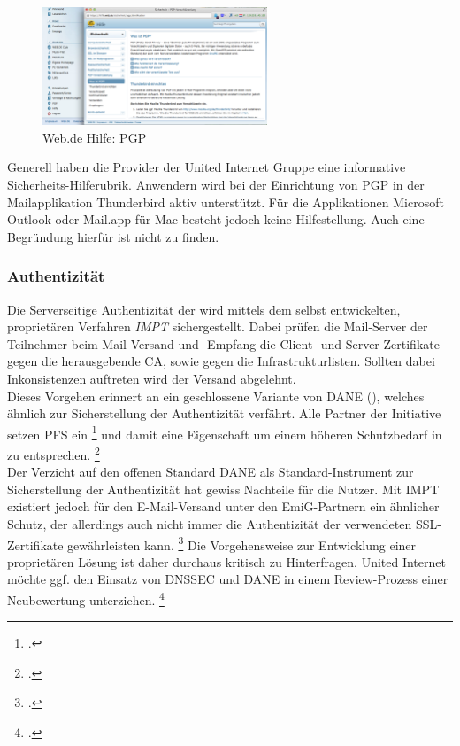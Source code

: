 \documentclass  [paper=a4,
				fontsize=12pt,
				listof=totoc,
				bibliography=totoc
				]{scrreprt}
\begin{document}
			\begin{figure} %
				\vspace{-12pt}
				\centering
				\includegraphics[width=0.6\textwidth]{images/Web-de_Hilfe_PGP}
				\caption[Web.de PGP]{Web.de Hilfe: PGP} 
				\label{fig:Web-de_Hilfe_PGP} %
				\vspace{-24pt}
			\end{figure}
			Generell haben die Provider der United Internet Gruppe eine informative Sicherheits-Hilferubrik.
			Anwendern wird bei der Einrichtung von \ac{PGP} in der Mailapplikation Thunderbird aktiv unterstützt.
			Für die Applikationen Microsoft Outlook oder Mail.app für Mac besteht jedoch keine Hilfestellung.
			Auch eine Begründung hierfür ist nicht zu finden.
		\subsubsection{Authentizität}
		\label{subsubsec:emig-auth}	
			Die Serverseitige Authentizität der wird mittels dem selbst entwickelten, proprietären Verfahren \textit{\ac{IMPT}} sichergestellt. 
			Dabei prüfen die Mail-Server der Teilnehmer beim Mail-Versand und -Empfang die Client- und Server-Zertifikate gegen die herausgebende \ac{CA}, sowie gegen die Infrastrukturlisten.
			Sollten dabei Inkonsistenzen auftreten wird der Versand abgelehnt.\\
			Dieses Vorgehen erinnert an ein geschlossene Variante von \ac{DANE} (), welches ähnlich zur Sicherstellung der Authentizität verfährt.
			Alle Partner der Initiative setzen \ac{PFS} ein
			\footcite[Vgl.][]{Zivadino14a}
			und damit eine Eigenschaft um einem höheren Schutzbedarf in zu entsprechen.
			\footcite[Vgl.][]{Zivadino14b} 
			\medskip\\
			Der Verzicht auf den offenen Standard \ac{DANE} als Standard-Instrument zur Sicherstellung der Authentizität hat gewiss Nachteile für die Nutzer. 
			Mit \acl{IMPT} existiert jedoch für den E-Mail-Versand unter den \ac{EmiG}-Partnern ein ähnlicher Schutz, der allerdings auch nicht immer die Authentizität der verwendeten \ac{SSL}-Zertifikate gewährleisten kann.
			\footcite[Vgl.][]{Zivadino14a}
			Die Vorgehensweise zur Entwicklung einer proprietären Lösung ist daher durchaus kritisch zu Hinterfragen. 
			United Internet möchte ggf. den Einsatz von \ac{DNSSEC} und \ac{DANE} in einem Review-Prozess einer Neubewertung unterziehen.
			\footcite[Vgl.][]{Zivadino14b}
\end{document}

